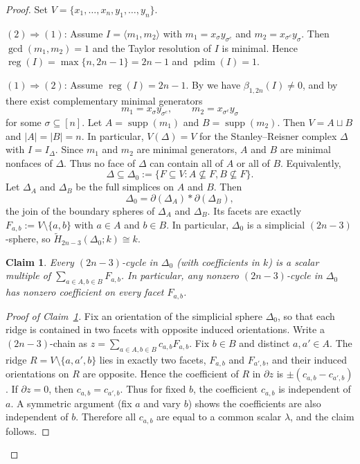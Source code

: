 \documentclass[12pt]{amsart}
\newtheorem{claim}[theorem]{Claim}
\theoremstyle{remark}
\theoremstyle{definition}
\DeclareMathOperator{\reg}{reg}
\DeclareMathOperator{\pd}{pdim}
\DeclareMathOperator{\supp}{supp}
\begin{document}
 \begin{proof}
Set \(V=\{x_1,\dots,x_n,y_1,\dots,y_n\}\).

\((2)\Rightarrow(1)\):
Assume \(I=\langle m_1,m_2\rangle\) with \(m_1=x_\sigma y_{\sigma^c}\) and \(m_2=x_{\sigma^c}y_\sigma\).
Then \(\gcd(m_1,m_2)=1\) and the Taylor resolution of $I$ is minimal. 
Hence \(\reg(I)=\max\{ n, 2n-1 \}=2n-1\) and \(\pd(I)=1\).

\((1)\Rightarrow(2)\):
Assume \(\reg(I)=2n-1\). By  we have \(\beta_{1,2n}(I)\neq 0\), and by
 there exist complementary minimal generators
\[
m_1=x_\sigma y_{\sigma^c},\qquad m_2=x_{\sigma^c}y_\sigma
\]
for some \(\sigma\subseteq[n]\). Let \(A=\supp(m_1)\) and \(B=\supp(m_2)\). Then \(V=A\sqcup B\) and
\(|A|=|B|=n\). In particular,  \(V(\Delta)=V\) for the Stanley--Reisner complex \(\Delta\) with \(I=I_\Delta\).
Since \(m_1\) and \(m_2\) are minimal generators, \(A\) and \(B\) are minimal nonfaces of \(\Delta\).
Thus no face of \(\Delta\) can contain all of \(A\) or all of \(B\).  Equivalently,
\[
\Delta \subseteq \Delta_0  := \{F\subseteq V : A\nsubseteq F,  B\nsubseteq F\}.
\]
Let $\Delta_A$ and $\Delta_B$ be the full simplices on $A$ and $B$.  Then
\[
\Delta_0=\partial(\Delta_A)*\partial(\Delta_B),
\]
the join of the boundary spheres of $\Delta_A$ and $\Delta_B$. Its facets are exactly
\(F_{a,b}:=V\setminus\{a,b\}\) with \(a\in A\) and \(b\in B\).
In particular, \(\Delta_0\) is a simplicial \((2n-3)\)-sphere, so
\(\widetilde H_{2n-3}(\Delta_0;k)\cong k\).

\begin{claim}\label{clm:topcycle-uses-all-facets-regsec}
Every \((2n-3)\)-cycle in \(\Delta_0\) (with coefficients in \(k\)) is a scalar multiple of
\(\sum_{a\in A,  b\in B} F_{a,b}\). In particular, any nonzero \((2n-3)\)-cycle in \(\Delta_0\)
has nonzero coefficient on every facet \(F_{a,b}\).
\end{claim}

\begin{proof}[Proof of Claim~\ref{clm:topcycle-uses-all-facets-regsec}]
Fix an orientation of the simplicial sphere \(\Delta_0\), so that each ridge is contained in two
facets with opposite induced orientations. Write a \((2n-3)\)-chain as
\(z=\sum_{a\in A,  b\in B} c_{a,b} F_{a,b}\).
Fix \(b\in B\) and distinct \(a,a'\in A\). The ridge \(R=V\setminus\{a,a',b\}\) lies in exactly two facets,
\(F_{a,b}\) and \(F_{a',b}\), and their induced orientations on \(R\) are opposite. Hence the coefficient
of \(R\) in \(\partial z\) is \(\pm(c_{a,b}-c_{a',b})\). If \(\partial z=0\), then \(c_{a,b}=c_{a',b}\).
Thus for fixed \(b\), the coefficient \(c_{a,b}\) is independent of \(a\). A symmetric argument (fix \(a\)
and vary \(b\)) shows the coefficients are also independent of \(b\). Therefore all \(c_{a,b}\) are equal
to a common scalar \(\lambda\), and the claim follows.
\end{proof}


\end{proof}
\end{document}
